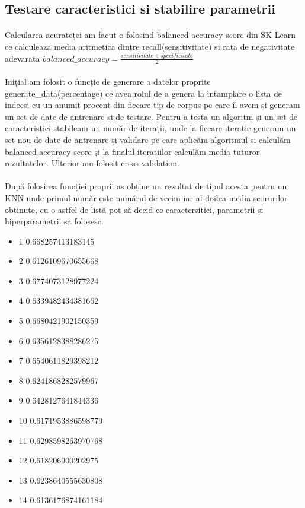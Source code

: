 \documentclass{article}
\begin{document}
 
\subsection{Testare caracteristici si stabilire parametrii}
\paragraph{} Calcularea acurateței am facut-o folosind balanced accuracy score
din SK Learn ce calculeaza media aritmetica dintre recall(sensitivitate) si
rata de negativitate adevarata $balanced\_accuracy = \frac{sensitivitate+specificitate}{2}$
 
\paragraph{}Inițial am folosit o funcție de generare a datelor proprite generate\_data(percentage) ce avea rolul de a genera la intamplare o lista de indecsi cu un anumit procent din fiecare tip de corpus pe care îl avem și generam un set de date de antrenare si de testare. Pentru a testa un algoritm și un set de caracteristici stabileam un număr de iterații, unde la fiecare iterație generam un set nou de date de antrenare și validare pe care aplicăm algoritmul și calculăm balanced accuracy score și la finalul iteratiilor calculăm media tuturor rezultatelor. Ulterior am folosit cross validation.
 
\paragraph{}După folosirea funcției proprii as obține un rezultat de tipul acesta pentru un KNN unde primul număr este numărul de vecini iar al doilea media scorurilor obținute, cu o astfel de listă pot să decid ce caractersitici, parametrii și hiperparametrii sa folosesc.
\begin{itemize}
  \item 1 0.668257413183145
  \item 2 0.6126109670655668
  \item 3 0.6774073128977224
  \item 4 0.6339482434381662
  \item 5 0.6680421902150359
  \item 6 0.6356128388286275
  \item 7 0.6540611829398212
  \item 8 0.6241868282579967
  \item 9 0.6428127641844336
  \item 10 0.6171953886598779
  \item 11 0.6298598263970768
  \item 12 0.618206900202975
  \item 13 0.6238640555630808
  \item 14 0.6136176874161184
\end{itemize}
 
\end{document}
